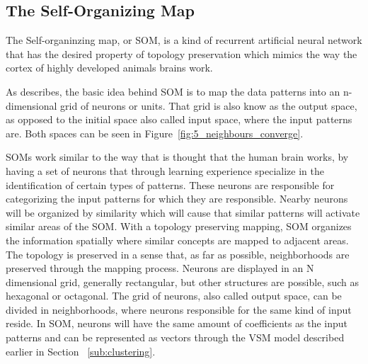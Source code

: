 
\subsection{The Self-Organizing Map} %
\label{sub:the_self_organizing_map}

The Self-organinzing map, or SOM, is a kind of recurrent artificial neural network that has the desired property of topology preservation which mimics the way the cortex of highly developed animals brains work.

As \citet{Bacao2005} describes, the basic idea behind SOM is to map the data patterns into an n-dimensional grid of neurons or units. That grid is also know as the output space, as opposed to the initial space also called input space, where the input patterns are. Both spaces can be seen in Figure~\ref{fig:5_neighbours_converge}.

SOMs work similar to the way that is thought that the human brain works, by having a set of neurons that through learning experience specialize in the identification of certain types of patterns. These neurons are responsible for categorizing the input patterns for which they are responsible. Nearby neurons will be organized by similarity which will cause that similar patterns will activate similar areas of the SOM.
With a topology preserving mapping, SOM organizes the information spatially where similar concepts are mapped to adjacent areas. The topology is preserved in a sense that, as far as possible, neighborhoods are preserved through the mapping process.
Neurons are displayed in an N dimensional grid, generally rectangular, but other structures are possible, such as hexagonal or octagonal.  The grid of neurons, also called output space, can be divided in neighborhoods, where neurons responsible for the same kind of input reside.
In SOM, neurons will have the same amount of coefficients as the input patterns and can be represented as vectors through the VSM model described earlier in Section ~\ref{sub:clustering}.

